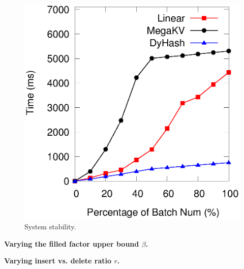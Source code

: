 \begin{figure}[h]
\begin{minipage}{0.18\linewidth}
		\centerline{\dsali}
	\end{minipage}
	\hfill
	\begin{minipage}{0.18\linewidth}\centering
		\includegraphics[width=\linewidth]{pic/dynamic-stability/dynamic-sta-random.eps}
		\centerline{\dsrandom}
	\end{minipage}
	\caption{System stability.}
	\label{fig:vary-alpha-stability}
\end{figure}

\vspace{1mm}\noindent\textbf{Varying the filled factor upper bound $\beta$.}


\vspace{1mm}\noindent\textbf{Varying insert vs. delete ratio $r$.}

